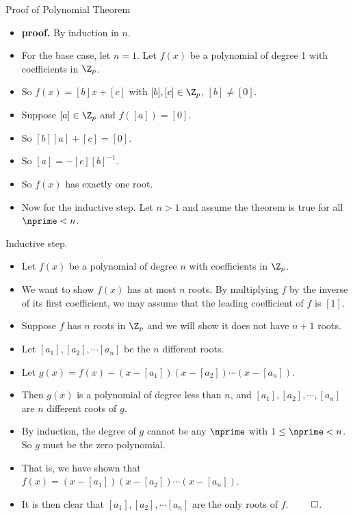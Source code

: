 \documentclass{beamer}
\begin{document}
\begin{frame}{Proof of Polynomial Theorem}

\begin{itemize}
  \item \textbf{proof.} By induction in $n$.
  \item For the base case, let $n=1$. Let $f(x)$ be a polynomial of degree 1 with coefficients in $\Z_p$.
  \item So $f(x) = [b]x + [c]$ with $[b],[c]\in\Z_p$, $[b]\not=[0]$.
  \item Suppose $[a]\in\Z_p$ and $f([a]) = [0]$.
  \item So $[b][a]+[c]=[0]$.
  \item So $[a] = -[c][b]^{-1}$.
  \item So $f(x)$ has exactly one root.
  \item Now for the inductive step. Let $n>1$ and assume the theorem is true for all $\nprime < n$.
\end{itemize}

\end{frame}

\begin{frame}{Inductive step.}

\begin{itemize}
  \item Let $f(x)$ be a polynomial of degree $n$ with coefficients in $\Z_p$.
  \item We want to show $f(x)$ has at most $n$ roots. By multiplying $f$ by the inverse of its first coefficient, we
  may assume that the leading coefficient of $f$ is $[1]$.
  \item Suppose $f$ has $n$ roots in $\Z_p$ and we will show it does not have $n+1$ roots.
  \item Let $[a_1],[a_2],\cdots[a_n]$ be the $n$ different roots.
  \item Let $g(x) = f(x) - (x-[a_1])(x-[a_2])\cdots(x-[a_n])$.
  \item Then $g(x)$ is a polynomial of degree less than $n$, and $[a_1],[a_2],\cdots,[a_n]$ are $n$ different roots of $g$.
  \item By induction, the degree of $g$ cannot be any $\nprime$ with $1\leq\nprime < n$. So $g$ must be the zero polynomial.
  \item That is, we have shown that $f(x) = (x-[a_1])(x-[a_2])\cdots(x-[a_n])$.
  \item It is then clear that $[a_1],[a_2],\cdots[a_n]$ are the only roots of $f$. $\qed$.
\end{itemize}

\end{frame}
\end{document}
